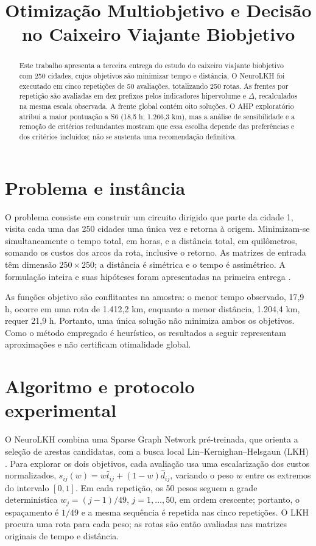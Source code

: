 \documentclass[conference]{IEEEtran}
\title{Otimização Multiobjetivo e Decisão no Caixeiro Viajante Biobjetivo}
\author{
\IEEEauthorblockN{Cláudio Márcio Campos Paixão, Filipe Carvalho de Andrade e Matheus Cascalho dos Santos}
\IEEEauthorblockA{Programa de Pós-Graduação em Engenharia Elétrica\\
Universidade Federal de Minas Gerais, Belo Horizonte, Brasil\\
EEE910A --- Otimização Multiobjetivo\\
Professor: Lucas S. Batista}
}
\begin{document}
\renewcommand{\abstractname}{Resumo}
\renewcommand{\refname}{Referências}
\maketitle

\begin{abstract}
Este trabalho apresenta a terceira entrega do estudo do caixeiro viajante
biobjetivo com 250 cidades, cujos objetivos são minimizar tempo e distância.
O NeuroLKH foi executado em cinco repetições de 50 avaliações, totalizando
250 rotas. As frentes por repetição são avaliadas em dez prefixos pelos
indicadores hipervolume e $\Delta$, recalculados na mesma escala observada.
A frente global contém oito soluções. O AHP exploratório atribui a maior
pontuação a S6 (18,5 h; 1.266,3 km), mas a análise de sensibilidade e a
remoção de critérios redundantes mostram que essa escolha depende das
preferências e dos critérios incluídos; não se sustenta uma recomendação
definitiva.
\end{abstract}

\section{Problema e instância}

O problema consiste em construir um circuito dirigido que parte da cidade 1,
visita cada uma das 250 cidades uma única vez e retorna à origem. Minimizam-se
simultaneamente o tempo total, em horas, e a distância total, em quilômetros,
somando os custos dos arcos da rota, inclusive o retorno. As matrizes de entrada
têm dimensão $250\times250$; a distância é simétrica e o tempo é assimétrico.
A formulação inteira e suas hipóteses foram apresentadas na primeira entrega
\cite{modelagem}.

As funções objetivo são conflitantes na amostra: o menor tempo observado,
17,9 h, ocorre em uma rota de 1.412,2 km, enquanto a menor distância,
1.204,4 km, requer 21,9 h. Portanto, uma única solução não minimiza ambos os
objetivos. Como o método empregado é heurístico, os resultados a seguir
representam aproximações e não certificam otimalidade global.

\section{Algoritmo e protocolo experimental}

O NeuroLKH combina uma Sparse Graph Network pré-treinada, que orienta a
seleção de arestas candidatas, com a busca local Lin--Kernighan--Helsgaun
(LKH) \cite{neurolkh}. Para explorar os dois objetivos, cada avaliação usa
uma escalarização dos custos normalizados,
$s_{ij}(w)=w\hat{t}_{ij}+(1-w)\hat{d}_{ij}$, variando o peso $w$ entre os
extremos do intervalo $[0,1]$. Em cada repetição, os 50 pesos seguem a grade
determinística $w_j=(j-1)/49$, $j=1,\ldots,50$, em ordem crescente; portanto,
o espaçamento é $1/49$ e a mesma sequência é repetida nas cinco repetições.
O LKH procura uma rota para cada peso; as rotas são então avaliadas nas
matrizes originais de tempo e distância.
\end{document}

